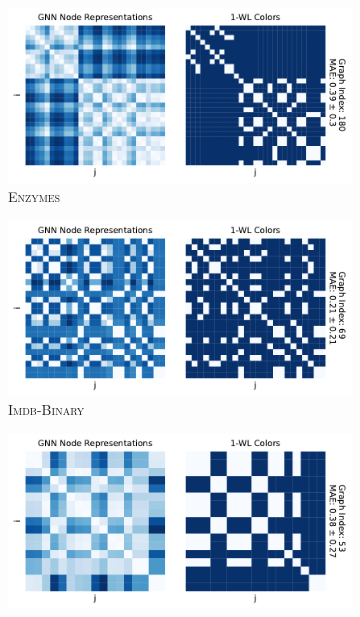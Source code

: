 \begin{figure}[H]
	\centering
	\begin{subfigure}[b]{0.49\textwidth}
		\centering
		\includegraphics[width=\textwidth]{Figures/heatmaps_ENZYMES_single.pdf}
		\vspace*{-5ex} 
        \caption{\textsc{Enzymes}}
	\end{subfigure}
	\hfill
	\begin{subfigure}[b]{0.49\textwidth}
		\centering
		\includegraphics[width=\textwidth]{Figures/heatmaps_IMDB-BINARY_single.pdf}
		\vspace*{-5ex} 
        \caption{\textsc{Imdb-Binary}}
	\end{subfigure}
	\par\bigskip
	\begin{subfigure}[b]{0.49\textwidth}
		\centering
		\includegraphics[width=\textwidth]{Figures/heatmaps_MUTAG_single.pdf}

\end{subfigure}
\end{figure}
